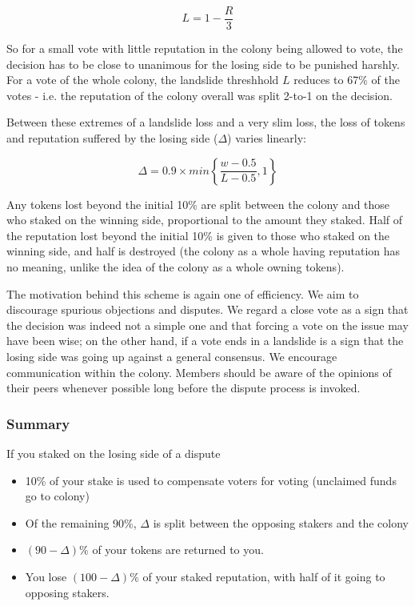 \[
L = 1 - \frac{R}{3}
\]

So for a small vote with little reputation in the colony being allowed to vote, the decision has to be close to unanimous for the losing side to be punished harshly. For a vote of the whole colony, the landslide threshhold $L$ reduces to 67\% of the votes - i.e. the reputation of the colony overall was split 2-to-1 on the decision.

Between these extremes of a landslide loss and a very slim loss, the loss of tokens and reputation suffered by the losing side ($\Delta$) varies linearly:

\[
 \Delta = 0.9 \times min \left\lbrace \frac{w-0.5}{L-0.5}, 1 \right\rbrace
\]


Any tokens lost beyond the initial 10\% are split between the colony and those who staked on the winning side, proportional to the amount they staked. Half of the reputation lost beyond the initial 10\% is given to those who staked on the winning side, and half is destroyed (the colony as a whole having reputation has no meaning, unlike the idea of the colony as a whole owning tokens).

The motivation behind this scheme is again one of efficiency. We aim to discourage spurious objections and disputes. We regard a close vote as a sign that the decision was indeed not a simple one and that forcing a vote on the issue may have been wise; on the other hand, if a vote ends in a landslide is a sign that the losing side was going up against a general consensus. We encourage communication within the colony. Members should be aware of the opinions of their peers whenever possible long before the dispute process is invoked.

\subsubsection*{Summary}
If you staked on the losing side of a dispute
\begin{itemize}
 \item 10\% of your stake is used to compensate voters for voting (unclaimed funds go to colony)
 \item Of the remaining 90\%, $\Delta$ is split between the opposing stakers and the colony
 \item $(90-\Delta)\%$ of your tokens are returned to you.
 \item You lose $(100-\Delta)\%$ of your staked reputation, with half of it going to opposing stakers.
\end{itemize}


